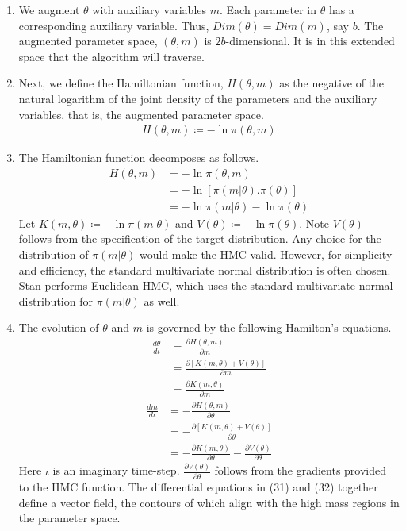 \documentclass[12pt,letterpaper,reqno,fleqn]{article}
\begin{document}
\begin{enumerate}
\item We augment $\theta$ with auxiliary variables $m$. Each parameter in $\theta$ has a corresponding auxiliary variable. Thus, $Dim(\theta) = Dim(m)$, say $b$. The augmented parameter space, $(\theta, m)$ is $2b$-dimensional. It is in this extended space that the algorithm will traverse.
\item Next, we define the Hamiltonian function, $H(\theta, m)$ as the negative of the natural logarithm of the joint density of the parameters and the auxiliary variables, that is, the augmented parameter space.
\begin{align}
H(\theta, m) \coloneqq - \ln \pi(\theta, m)
\end{align}
\item The Hamiltonian function decomposes as follows. 
\begin{align}
H(\theta, m) &= - \ln \pi(\theta, m) \\ \nonumber
&= - \ln [\pi(m | \theta). \pi(\theta)] \\ \nonumber
&= -\ln \pi(m | \theta) - \ln \pi(\theta)
\end{align}
Let $K(m, \theta) \coloneqq -\ln \pi(m | \theta)$ and $V(\theta) \coloneqq - \ln \pi(\theta)$. Note $V(\theta)$ follows from the specification of the target distribution. Any choice for the distribution of $\pi(m|\theta)$ would make the HMC valid. However, for simplicity and efficiency, the standard multivariate normal distribution is often chosen. Stan performs Euclidean HMC, which uses the standard multivariate normal distribution for $\pi(m|\theta)$ as well. 
\item The evolution of $\theta$ and $m$ is governed by the following Hamilton's equations.
\begin{align}
\frac{d\theta}{d\iota} &= \frac{\partial H(\theta, m)}{\partial m} \\ \nonumber
&= \frac{\partial[K(m, \theta) + V(\theta)]}{\partial m} \\ \nonumber
&= \frac{\partial K(m, \theta)}{\partial m}
\end{align}
\begin{align}
\frac{d m}{d \iota} &= - \frac{\partial H(\theta, m)}{\partial \theta} \\ \nonumber
&= - \frac{\partial[K(m, \theta) + V(\theta)]}{\partial \theta} \\ \nonumber
&= - \frac{\partial K(m, \theta)}{\partial \theta} - \frac{\partial V(\theta)}{\partial \theta}
\end{align}
Here $\iota$ is an imaginary time-step. $\frac{\partial V(\theta)}{\partial \theta}$ follows from the gradients provided to the HMC function. The differential equations in (31) and (32) together define a vector field, the contours of which align with the high mass regions in the parameter space. 
\end{enumerate}
\end{document}
